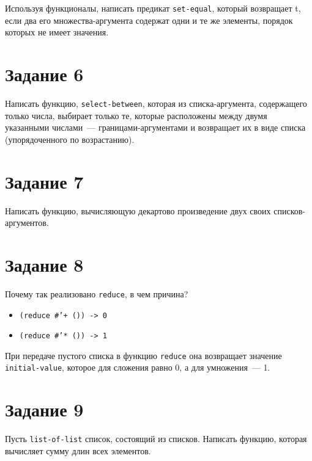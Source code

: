 Используя функционалы, написать предикат \texttt{set-equal}, который возвращает t, если два его множества-аргумента содержат одни и те же элементы, порядок которых не имеет значения.


\section{Задание 6}

Написать функцию, \texttt{select-between}, которая из списка-аргумента, содержащего только числа, выбирает только те, которые расположены между двумя указанными числами~--- границами-аргументами и возвращает их в виде списка (упорядоченного по возрастанию).


\section{Задание 7}

Написать функцию, вычисляющую декартово произведение двух своих списков-аргументов.


\section{Задание 8}

Почему так реализовано \texttt{reduce}, в чем причина?
\begin{itemize}[noitemsep, label=""]
	\item \texttt{(reduce \#'+ ()) -> 0}
	\item \texttt{(reduce \#'* ()) -> 1}
\end{itemize}

При передаче пустого списка в функцию \texttt{reduce} она возвращает значение \texttt{initial-value}, которое для сложения равно 0, а для умножения~--- 1.

\section{Задание 9}

Пусть \texttt{list-of-list} список, состоящий из списков. Написать функцию, которая вычисляет сумму длин всех элементов.

